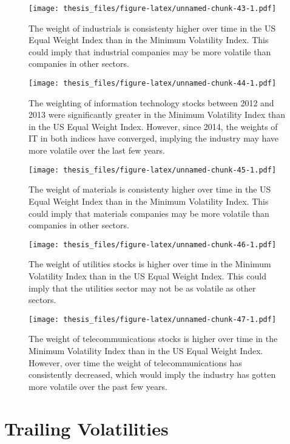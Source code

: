 \documentclass[12pt,twoside]{reedthesis}
\theoremstyle{definition}
\theoremstyle{definition}
\theoremstyle{definition}
\theoremstyle{remark}
\begin{document}
\begin{figure}[htbp]
\centering
\texttt{[image: thesis\_files/figure-latex/unnamed-chunk-43-1.pdf]}
\caption{\label{fig:unnamed-chunk-43}The weight of industrials is
consistenty higher over time in the US Equal Weight Index than in the
Minimum Volatility Index. This could imply that industrial companies may
be more volatile than companies in other sectors.}
\end{figure}
\begin{figure}[htbp]
\centering
\texttt{[image: thesis\_files/figure-latex/unnamed-chunk-44-1.pdf]}
\caption{\label{fig:unnamed-chunk-44}The weighting of information technology
stocks between 2012 and 2013 were significantly greater in the Minimum
Volatility Index than in the US Equal Weight Index. However, since 2014,
the weights of IT in both indices have converged, implying the industry
may have more volatile over the last few years.}
\end{figure}
\begin{figure}[htbp]
\centering
\texttt{[image: thesis\_files/figure-latex/unnamed-chunk-45-1.pdf]}
\caption{\label{fig:unnamed-chunk-45}The weight of materials is consistenty
higher over time in the US Equal Weight Index than in the Minimum
Volatility Index. This could imply that materials companies may be more
volatile than companies in other sectors.}
\end{figure}
\begin{figure}[htbp]
\centering
\texttt{[image: thesis\_files/figure-latex/unnamed-chunk-46-1.pdf]}
\caption{\label{fig:unnamed-chunk-46}The weight of utilities stocks is
higher over time in the Minimum Volatility Index than in the US Equal
Weight Index. This could imply that the utilities sector may not be as
volatile as other sectors.}
\end{figure}
\begin{figure}[htbp]
\centering
\texttt{[image: thesis\_files/figure-latex/unnamed-chunk-47-1.pdf]}
\caption{\label{fig:unnamed-chunk-47}The weight of telecommunications stocks
is higher over time in the Minimum Volatility Index than in the US Equal
Weight Index. However, over time the weight of telecommunications has
consistently decreased, which would imply the industry has gotten more
volatile over the past few years.}
\end{figure}
\clearpage 

\section{Trailing Volatilities}\label{trailing-volatilities}
\end{document}
